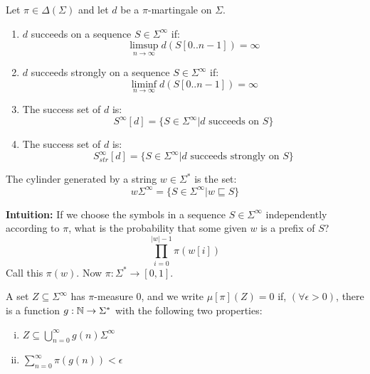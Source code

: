 \documentclass[../main.tex]{subfiles}
\begin{document}
\begin{defn}
    Let $\pi \in \Delta(\Sigma)$ and let $d$ be a $\pi$-martingale on $\Sigma$.
    \begin{enumerate}
        \item $d$ succeeds on a sequence $S \in \Sigma^{\infty}$ if:
            \begin{equation*}
                \limsup\limits_{n \rightarrow \infty} d(S[0..n-1]) = \infty
            \end{equation*}
        \item $d$ succeeds strongly on a sequence $S \in \Sigma^{\infty}$ if:
            \begin{equation*}
                \liminf\limits_{n \rightarrow \infty} d(S[0..n-1]) = \infty
            \end{equation*}
        \item The success set of $d$ is:
            \begin{equation*}
                S^{\infty}[d] = \{ S \in \Sigma^{\infty} | d \text{ succeeds on } S \}
            \end{equation*}
        \item The success set of $d$ is:
            \begin{equation*}
                S^{\infty}_{str}[d] = \{ S \in \Sigma^{\infty} | d \text{ succeeds strongly on } S \}
            \end{equation*}
    \end{enumerate}
\end{defn}

\begin{defn}
    The cylinder generated by a string $w \in \Sigma^{*}$ is the set:
    \begin{equation*}
        w\Sigma^{\infty} = \{ S \in \Sigma^{\infty} | w \sqsubseteq	S \}
    \end{equation*}
\end{defn}

\textbf{Intuition:}
If we choose the symbols in a sequence $S \in \Sigma^{\infty}$ independently
according to $\pi$, what is the probability that some given $w$ is a prefix
of $S$?
\begin{equation*}
    \prod_{i=0}^{|w| - 1} \pi(w[i])
\end{equation*}
Call this $\pi(w)$. Now $\pi: \Sigma^{*} \rightarrow [0, 1]$.

\begin{defn}
    A set $Z \subseteq \Sigma^{\infty}$ has $\pi$-measure 0, and we write
    $\mu[\pi](Z) = 0$ if, $(\forall \epsilon > 0)$, there is a function
    $g: \mathbb{N} \rightarrow \Sigma^{*}$ with the following two properties:
    \begin{enumerate}[(i)]
        \item $Z \subseteq \bigcup\limits_{n=0}^{\infty} g(n)\Sigma^{\infty}$
        \item $\sum_{n=0}^{\infty} \pi(g(n)) < \epsilon$
    \end{enumerate}
\end{defn}
\end{document}
